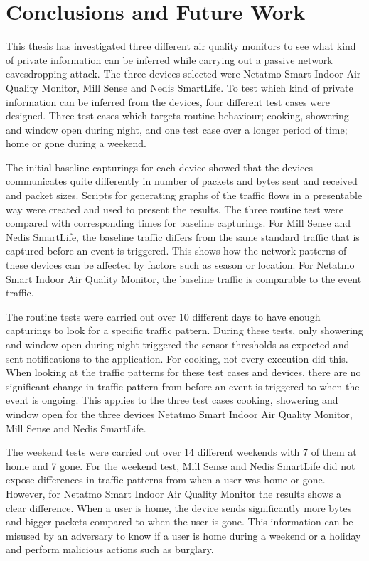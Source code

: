 \chapter{Conclusions and Future Work}
This thesis has investigated three different air quality monitors to see what kind of private information can be inferred while carrying out a passive network eavesdropping attack. The three devices selected were Netatmo Smart Indoor Air Quality Monitor, Mill Sense and Nedis SmartLife. To test which kind of private information can be inferred from the devices, four different test cases were designed. Three test cases which targets routine behaviour; cooking, showering and window open during night, and one test case over a longer period of time; home or gone during a weekend. 

The initial baseline capturings for each device showed that the devices communicates quite differently in number of packets and bytes sent and received and packet sizes. Scripts for generating graphs of the traffic flows in a presentable way were created and used to present the results. The three routine test were compared with corresponding times for baseline capturings. For Mill Sense and Nedis SmartLife, the baseline traffic differs from the same standard traffic that is captured before an event is triggered. This shows how the network patterns of these devices can be affected by factors such as season or location. For Netatmo Smart Indoor Air Quality Monitor, the baseline traffic is comparable to the event traffic. 

The routine tests were carried out over 10 different days to have enough capturings to look for a specific traffic pattern. During these tests, only showering and window open during night triggered the sensor thresholds as expected and sent notifications to the application. For cooking, not every execution did this. When looking at the traffic patterns for these test cases and devices, there are no significant change in traffic pattern from before an event is triggered to when the event is ongoing. This applies to the three test cases cooking, showering and window open for the three devices Netatmo Smart Indoor Air Quality Monitor, Mill Sense and Nedis SmartLife.  

The weekend tests were carried out over 14 different weekends with 7 of them at home and 7 gone. For the weekend test, Mill Sense and Nedis SmartLife did not expose differences in traffic patterns from when a user was home or gone. However, for Netatmo Smart Indoor Air Quality Monitor the results shows a clear difference. When a user is home, the device sends significantly more bytes and bigger packets compared to when the user is gone. This information can be misused by an adversary to know if a user is home during a weekend or a holiday and perform malicious actions such as burglary. 

